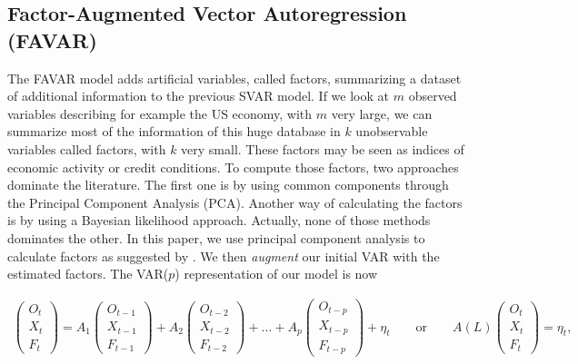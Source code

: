 \documentclass[11pt,a4paper]{article}
\begin{document}
%
% 

\subsection{Factor-Augmented Vector Autoregression (FAVAR) \label{subsec:favar}}

The FAVAR model adds artificial variables, called factors, summarizing a dataset of additional information to the previous SVAR model. 
If we look at $m$ observed variables describing for example the US economy, with $m$ very large, we can summarize most of the  information of this huge database in $k$ unobservable variables called factors, with $k$ very small. These factors may be seen as indices of economic activity or credit conditions. 
To compute those factors, two approaches dominate the literature. The first one is by using common components through the Principal Component Analysis (PCA). 
Another way of calculating the factors is by using a Bayesian likelihood approach. Actually, none of those methods dominates the other. In this paper, we use principal component analysis to calculate factors as suggested by \cite{stock2015factor}. 
We then \emph{augment} our initial VAR with the estimated factors. 
The VAR($p$) representation of our model is now  


{ \footnotesize \begin{align*}
 \begin{pmatrix} O_t \\ X_t \\ F_t \end{pmatrix} = 
A_1 \begin{pmatrix} O_{t-1} \\ X_{t-1} \\ F_{t-1} \end{pmatrix} +
A_2 \begin{pmatrix} O_{t-2} \\ X_{t-2}\\ F_{t-2} \end{pmatrix} +
\dots +
A_p \begin{pmatrix} O_{t-p} \\ X_{t-p}\\ F_{t-p} \end{pmatrix}
+ \eta_t 
\qquad \text{or} \qquad
A(L) \begin{pmatrix} O_t \\ X_t \\ F_t \end{pmatrix} = \eta_t,
\end{align*} }
\end{document}
